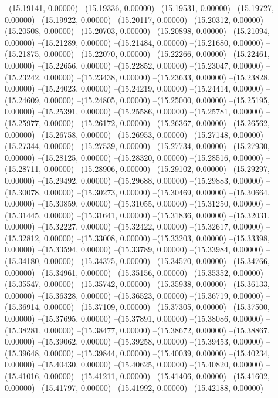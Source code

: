 --(15.19141, 0.00000)
--(15.19336, 0.00000)
--(15.19531, 0.00000)
--(15.19727, 0.00000)
--(15.19922, 0.00000)
--(15.20117, 0.00000)
--(15.20312, 0.00000)
--(15.20508, 0.00000)
--(15.20703, 0.00000)
--(15.20898, 0.00000)
--(15.21094, 0.00000)
--(15.21289, 0.00000)
--(15.21484, 0.00000)
--(15.21680, 0.00000)
--(15.21875, 0.00000)
--(15.22070, 0.00000)
--(15.22266, 0.00000)
--(15.22461, 0.00000)
--(15.22656, 0.00000)
--(15.22852, 0.00000)
--(15.23047, 0.00000)
--(15.23242, 0.00000)
--(15.23438, 0.00000)
--(15.23633, 0.00000)
--(15.23828, 0.00000)
--(15.24023, 0.00000)
--(15.24219, 0.00000)
--(15.24414, 0.00000)
--(15.24609, 0.00000)
--(15.24805, 0.00000)
--(15.25000, 0.00000)
--(15.25195, 0.00000)
--(15.25391, 0.00000)
--(15.25586, 0.00000)
--(15.25781, 0.00000)
--(15.25977, 0.00000)
--(15.26172, 0.00000)
--(15.26367, 0.00000)
--(15.26562, 0.00000)
--(15.26758, 0.00000)
--(15.26953, 0.00000)
--(15.27148, 0.00000)
--(15.27344, 0.00000)
--(15.27539, 0.00000)
--(15.27734, 0.00000)
--(15.27930, 0.00000)
--(15.28125, 0.00000)
--(15.28320, 0.00000)
--(15.28516, 0.00000)
--(15.28711, 0.00000)
--(15.28906, 0.00000)
--(15.29102, 0.00000)
--(15.29297, 0.00000)
--(15.29492, 0.00000)
--(15.29688, 0.00000)
--(15.29883, 0.00000)
--(15.30078, 0.00000)
--(15.30273, 0.00000)
--(15.30469, 0.00000)
--(15.30664, 0.00000)
--(15.30859, 0.00000)
--(15.31055, 0.00000)
--(15.31250, 0.00000)
--(15.31445, 0.00000)
--(15.31641, 0.00000)
--(15.31836, 0.00000)
--(15.32031, 0.00000)
--(15.32227, 0.00000)
--(15.32422, 0.00000)
--(15.32617, 0.00000)
--(15.32812, 0.00000)
--(15.33008, 0.00000)
--(15.33203, 0.00000)
--(15.33398, 0.00000)
--(15.33594, 0.00000)
--(15.33789, 0.00000)
--(15.33984, 0.00000)
--(15.34180, 0.00000)
--(15.34375, 0.00000)
--(15.34570, 0.00000)
--(15.34766, 0.00000)
--(15.34961, 0.00000)
--(15.35156, 0.00000)
--(15.35352, 0.00000)
--(15.35547, 0.00000)
--(15.35742, 0.00000)
--(15.35938, 0.00000)
--(15.36133, 0.00000)
--(15.36328, 0.00000)
--(15.36523, 0.00000)
--(15.36719, 0.00000)
--(15.36914, 0.00000)
--(15.37109, 0.00000)
--(15.37305, 0.00000)
--(15.37500, 0.00000)
--(15.37695, 0.00000)
--(15.37891, 0.00000)
--(15.38086, 0.00000)
--(15.38281, 0.00000)
--(15.38477, 0.00000)
--(15.38672, 0.00000)
--(15.38867, 0.00000)
--(15.39062, 0.00000)
--(15.39258, 0.00000)
--(15.39453, 0.00000)
--(15.39648, 0.00000)
--(15.39844, 0.00000)
--(15.40039, 0.00000)
--(15.40234, 0.00000)
--(15.40430, 0.00000)
--(15.40625, 0.00000)
--(15.40820, 0.00000)
--(15.41016, 0.00000)
--(15.41211, 0.00000)
--(15.41406, 0.00000)
--(15.41602, 0.00000)
--(15.41797, 0.00000)
--(15.41992, 0.00000)
--(15.42188, 0.00000)
